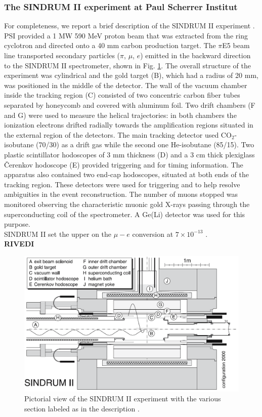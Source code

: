 \documentclass[12pt,a4paper,openright, oneside, titlepage]{book} %
\begin{document}
\subsubsection{The SINDRUM II experiment at Paul Scherrer Institut}
For completeness, we report a brief description of the SINDRUM II experiment \cite{SINDRUMII}. 
PSI provided a 1 MW 590 MeV proton beam that was extracted from the ring cyclotron 
and directed onto a 40 mm carbon production target. 
The $\pi$E5 beam line transported secondary particles ($\pi$, $\mu$, $e$) 
emitted in the backward direction to the SINDRUM II spectrometer, shown in Fig. \ref{_SINDRUM_II}.
The overall structure of the experiment was cylindrical and the gold target (B), 
which had a radius of 20 mm, was positioned in the middle of the detector.
The wall of the vacuum chamber inside the tracking region (C) consisted 
of two concentric carbon fiber tubes separated by honeycomb 
and covered with aluminum foil. 
Two drift chambers (F and G) were used to measure the helical trajectories: 
in both chambers the ionization electrons drifted radially towards the amplification regions 
situated in the external region of the detectors. 
The main tracking detector used CO$_2$-isobutane (70/30) as a drift gas while the second one He-isobutane (85/15).
Two plastic scintillator hodoscopes of 3 mm thickness (D) and a 3 cm thick plexiglass \v{C}erenkov hodoscope (E) 
provided triggering and for timing information. 
The apparatus also contained two end-cap hodoscopes, situated at both ends of the tracking region. 
These detectors were used for triggering and to help resolve ambiguities in the event reconstruction. 
The number of muons stopped was monitored observing the characteristic muonic gold X-rays passing through the superconducting coil of the spectrometer. A Ge(Li) detector was used for this purpose.\\
SINDRUM II set the upper on the $\mu-e$ conversion at $7\times10^{-13}$ \cite{SINDRUMII}.\\
\textbf{RIVEDI}

\begin{figure}[h!]
\centering
\includegraphics[scale=0.6]{SINDRUM_II}
\caption{Pictorial view of the SINDRUM II experiment with the various section labeled as in the description \cite{SINDRUMII}.}
\label{_SINDRUM_II}
\end{figure}
\end{document}
